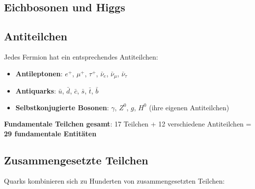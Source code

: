 	\subsection{Eichbosonen und Higgs}
	
	\begin{table}[htbp]
		\centering
		\caption{Standard-Modell Eichbosonen und Higgs-Boson}
		\label{tab:sm_bosons}
	\end{table}
	
	\subsection{Antiteilchen}
	
	Jedes Fermion hat ein entsprechendes Antiteilchen:
	
	\begin{itemize}
		\item \textbf{Antileptonen}: $e^+$, $\mu^+$, $\tau^+$, $\bar{\nu}_e$, $\bar{\nu}_\mu$, $\bar{\nu}_\tau$
		\item \textbf{Antiquarks}: $\bar{u}$, $\bar{d}$, $\bar{c}$, $\bar{s}$, $\bar{t}$, $\bar{b}$
		\item \textbf{Selbstkonjugierte Bosonen}: $\gamma$, $Z^0$, $g$, $H^0$ (ihre eigenen Antiteilchen)
	\end{itemize}
	
	\textbf{Fundamentale Teilchen gesamt}: 17 Teilchen + 12 verschiedene Antiteilchen = \textbf{29 fundamentale Entitäten}
	
	\subsection{Zusammengesetzte Teilchen}
	
	Quarks kombinieren sich zu Hunderten von zusammengesetzten Teilchen:
	
